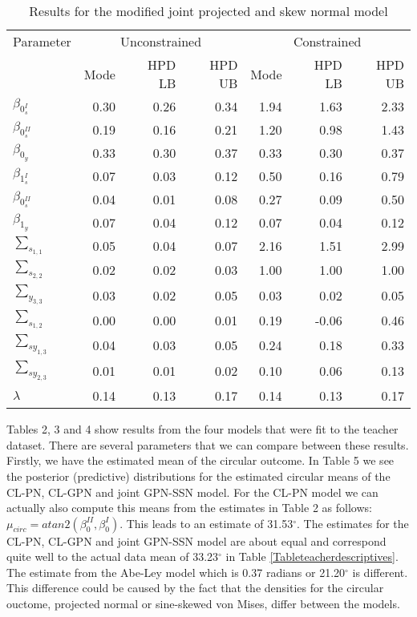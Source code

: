 \documentclass[11pt,]{article}
\begin{document}
\begin{table}

\caption{\label{tab:estCLMGPN}Results for the modified joint projected and skew normal model}
\centering
\begin{tabular}[t]{lrrrrrr}
\toprule
\multicolumn{1}{c}{Parameter} & \multicolumn{3}{c}{Unconstrained} & \multicolumn{3}{c}{Constrained} \\
\cmidrule(l{2pt}r{2pt}){1-1} \cmidrule(l{2pt}r{2pt}){2-4} \cmidrule(l{2pt}r{2pt}){5-7}
  & Mode & HPD LB & HPD UB & Mode & HPD LB & HPD UB\\
\midrule
$\beta_{0_s^{I}}$ & 0.30 & 0.26 & 0.34 & 1.94 & 1.63 & 2.33\\
$\beta_{0_s^{II}}$ & 0.19 & 0.16 & 0.21 & 1.20 & 0.98 & 1.43\\
$\beta_{0_y}$ & 0.33 & 0.30 & 0.37 & 0.33 & 0.30 & 0.37\\
$\beta_{1_s^{I}}$ & 0.07 & 0.03 & 0.12 & 0.50 & 0.16 & 0.79\\
$\beta_{0_s^{II}}$ & 0.04 & 0.01 & 0.08 & 0.27 & 0.09 & 0.50\\
\addlinespace
$\beta_{1_y}$ & 0.07 & 0.04 & 0.12 & 0.07 & 0.04 & 0.12\\
$\sum_{s_{1,1}}$ & 0.05 & 0.04 & 0.07 & 2.16 & 1.51 & 2.99\\
$\sum_{s_{2,2}}$ & 0.02 & 0.02 & 0.03 & 1.00 & 1.00 & 1.00\\
$\sum_{y_{3,3}}$ & 0.03 & 0.02 & 0.05 & 0.03 & 0.02 & 0.05\\
$\sum_{s_{1,2}}$ & 0.00 & 0.00 & 0.01 & 0.19 & -0.06 & 0.46\\
\addlinespace
$\sum_{sy_{1,3}}$ & 0.04 & 0.03 & 0.05 & 0.24 & 0.18 & 0.33\\
$\sum_{sy_{2,3}}$ & 0.01 & 0.01 & 0.02 & 0.10 & 0.06 & 0.13\\
$\lambda$ & 0.14 & 0.13 & 0.17 & 0.14 & 0.13 & 0.17\\
\bottomrule
\end{tabular}
\end{table}

Tables 2, 3 and 4 show results from the four models that were fit to the
teacher dataset. There are several parameters that we can compare
between these results. Firstly, we have the estimated mean of the
circular outcome. In Table 5 we see the posterior (predictive)
distributions for the estimated circular means of the CL-PN, CL-GPN and
joint GPN-SSN model. For the CL-PN model we can actually also compute
this means from the estimates in Table 2 as follows:
\(\mu_{circ} = atan2(\beta_0^{II}, \beta_0^{I})\). This leads to an
estimate of 31.53\(^\circ\). The estimates for the CL-PN, CL-GPN and
joint GPN-SSN model are about equal and correspond quite well to the
actual data mean of 33.23\(^\circ\) in Table
\ref{Tableteacherdescriptives}. The estimate from the Abe-Ley model
which is 0.37 radians or 21.20\(^\circ\) is different. This difference
could be caused by the fact that the densities for the circular ouctome,
projected normal or sine-skewed von Mises, differ between the models.
\end{document}
